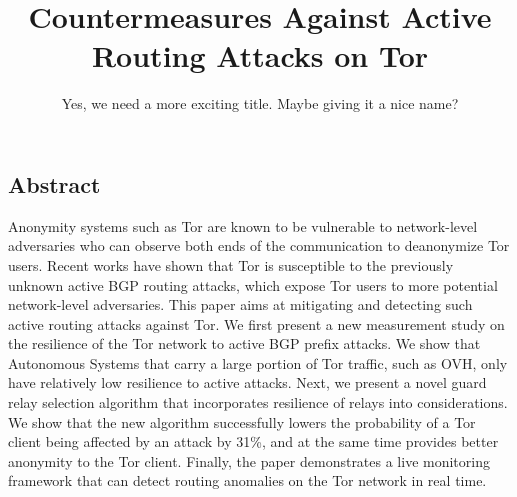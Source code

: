 \documentclass[letterpaper,twocolumn,10pt]{article}
\begin{document}
\date{}

\title{\Large \bf Countermeasures Against Active Routing Attacks on Tor}
\author{Yes, we need a more exciting title. Maybe giving it a nice name?}


\maketitle

\thispagestyle{empty}

\subsection*{Abstract}
Anonymity systems such as Tor are known to be vulnerable to network-level adversaries who can observe both ends of the communication to deanonymize Tor users. Recent works have shown that Tor is susceptible to the previously unknown active BGP routing attacks, which expose Tor users to more potential network-level adversaries. This paper aims at mitigating and detecting such active routing attacks against Tor. We first present a new measurement study on the resilience of the Tor network to active BGP prefix attacks. We show that Autonomous Systems that carry a large portion of Tor traffic, such as OVH, only have relatively low resilience to active attacks. Next, we present a novel guard relay selection algorithm that incorporates resilience of relays into considerations. We show that the new algorithm successfully lowers the probability of a Tor client being affected by an attack by 31\%, and at the same time provides better anonymity to the Tor client. Finally, the paper demonstrates a live monitoring framework that can detect routing anomalies on the Tor network in real time. 








%
%


{\footnotesize 
}

\end{document}
